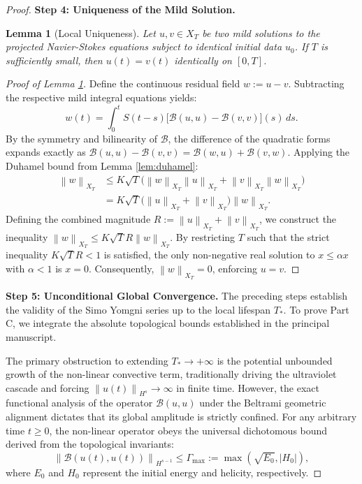 \documentclass[12pt,a4paper]{article}
\theoremstyle{plain}
\newtheorem{lemma}[theorem]{Lemma}
\theoremstyle{definition}
\theoremstyle{remark}
\newcommand{\norm}[1]{\left\|#1\right\|}
\newcommand{\BB}{\mathcal{B}}
\begin{document}
\begin{proof}
\noindent\textbf{Step 4: Uniqueness of the Mild Solution.}
\begin{lemma}[Local Uniqueness]
\label{lem:uniqueness}
Let $u, v \in X_T$ be two mild solutions to the projected Navier-Stokes equations subject to identical initial data $u_0$. If $T$ is sufficiently small, then $u(t) = v(t)$ identically on $[0,T]$.
\end{lemma}

\begin{proof}[Proof of Lemma \ref{lem:uniqueness}]
Define the continuous residual field $w := u - v$. Subtracting the respective mild integral equations yields:
\[
  w(t) = \int_0^t S(t-s)\big[\BB(u,u) - \BB(v,v)\big](s)\,ds.
\]
By the symmetry and bilinearity of $\BB$, the difference of the quadratic forms expands exactly as $\BB(u,u) - \BB(v,v) = \BB(w,u) + \BB(v,w)$. Applying the Duhamel bound from Lemma \ref{lem:duhamel}:
\begin{align*}
  \norm{w}_{X_T} 
  &\le K\sqrt{T} \big( \norm{w}_{X_T}\norm{u}_{X_T} + \norm{v}_{X_T}\norm{w}_{X_T} \big) \\
  &= K\sqrt{T} \big( \norm{u}_{X_T} + \norm{v}_{X_T} \big) \norm{w}_{X_T}.
\end{align*}
Defining the combined magnitude $R := \norm{u}_{X_T} + \norm{v}_{X_T}$, we construct the inequality $\norm{w}_{X_T} \le K\sqrt{T} R \norm{w}_{X_T}$. By restricting $T$ such that the strict inequality $K\sqrt{T} R < 1$ is satisfied, the only non-negative real solution to $x \le \alpha x$ with $\alpha < 1$ is $x = 0$. Consequently, $\norm{w}_{X_T} = 0$, enforcing $u = v$.
\end{proof}

\noindent\textbf{Step 5: Unconditional Global Convergence.}
The preceding steps establish the validity of the Simo Yomgni series up to the local lifespan $T_*$. To prove Part C, we integrate the absolute topological bounds established in the principal manuscript. 

The primary obstruction to extending $T_* \to +\infty$ is the potential unbounded growth of the non-linear convective term, traditionally driving the ultraviolet cascade and forcing $\norm{u(t)}_{H^s} \to \infty$ in finite time. However, the exact functional analysis of the operator $\BB(u,u)$ under the Beltrami geometric alignment dictates that its global amplitude is strictly confined. For any arbitrary time $t \ge 0$, the non-linear operator obeys the universal dichotomous bound derived from the topological invariants:
\[
  \norm{\BB(u(t), u(t))}_{H^{s-1}} \le \Gamma_{\max} := \max\left(\sqrt{E_0}, |H_0|\right),
\]
where $E_0$ and $H_0$ represent the initial energy and helicity, respectively.


\end{proof}
\end{document}
